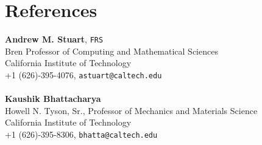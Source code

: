 \section{\sc References}

{\bf Andrew M. Stuart}, \texttt{FRS}\\
Bren Professor of Computing and Mathematical Sciences\\ 
California Institute of Technology\\
+1 (626)-395-4076,
\texttt{astuart@caltech.edu}\\
\vspace{.025in}\\
{\bf Kaushik Bhattacharya}\\ 
Howell N. Tyson, Sr., Professor of Mechanics and Materials Science\\ 
California Institute of Technology\\
+1 (626)-395-8306,
\texttt{bhatta@caltech.edu}\\
\vspace{.025in}\\
\endinput